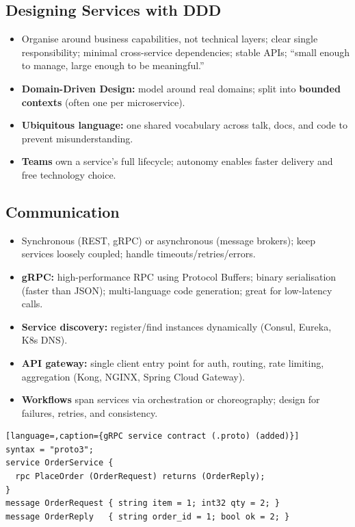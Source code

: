 \documentclass[hidelinks]{article}
\begin{document}
\subsection{Designing Services with DDD}
\begin{itemize}
  \item Organise around business capabilities, not technical layers; clear single responsibility;
        minimal cross-service dependencies; stable APIs; ``small enough to manage, large enough to
        be meaningful.''
  \item \textbf{Domain-Driven Design:} model around real domains; split into \textbf{bounded
        contexts} (often one per microservice).
  \item \textbf{Ubiquitous language:} one shared vocabulary across talk, docs, and code to prevent
        misunderstanding.
  \item \textbf{Teams} own a service's full lifecycle; autonomy enables faster delivery and free
        technology choice.
\end{itemize}

\subsection{Communication}
\begin{itemize}
  \item Synchronous (REST, gRPC) or asynchronous (message brokers); keep services loosely coupled;
        handle timeouts/retries/errors.
  \item \textbf{gRPC:} high-performance RPC using Protocol Buffers; binary serialisation (faster
        than JSON); multi-language code generation; great for low-latency calls.
  \item \textbf{Service discovery:} register/find instances dynamically (Consul, Eureka, K8s DNS).
  \item \textbf{API gateway:} single client entry point for auth, routing, rate limiting,
        aggregation (Kong, NGINX, Spring Cloud Gateway).
  \item \textbf{Workflows} span services via orchestration or choreography; design for failures,
        retries, and consistency.
\end{itemize}

\begin{lstlisting}[language=,caption={gRPC service contract (.proto) (added)}]
syntax = "proto3";
service OrderService {
  rpc PlaceOrder (OrderRequest) returns (OrderReply);
}
message OrderRequest { string item = 1; int32 qty = 2; }
message OrderReply   { string order_id = 1; bool ok = 2; }
\end{lstlisting}
\end{document}
